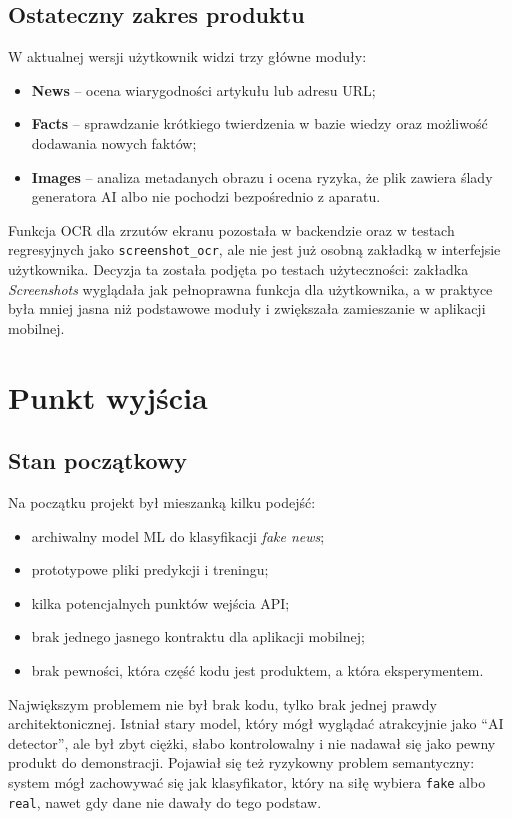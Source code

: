 \documentclass[12pt,a4paper]{article}
\begin{document}
\subsection{Ostateczny zakres produktu}
W aktualnej wersji użytkownik widzi trzy główne moduły:
\begin{itemize}
  \item \textbf{News} -- ocena wiarygodności artykułu lub adresu URL;
  \item \textbf{Facts} -- sprawdzanie krótkiego twierdzenia w bazie wiedzy oraz możliwość dodawania nowych faktów;
  \item \textbf{Images} -- analiza metadanych obrazu i ocena ryzyka, że plik zawiera ślady generatora AI albo nie pochodzi bezpośrednio z aparatu.
\end{itemize}

Funkcja OCR dla zrzutów ekranu pozostała w backendzie oraz w testach regresyjnych jako \texttt{screenshot\_ocr}, ale nie jest już osobną zakładką w interfejsie użytkownika.
Decyzja ta została podjęta po testach użyteczności: zakładka \textit{Screenshots} wyglądała jak pełnoprawna funkcja dla użytkownika, a w praktyce była mniej jasna niż podstawowe moduły i zwiększała zamieszanie w aplikacji mobilnej.

\section{Punkt wyjścia}
\subsection{Stan początkowy}
Na początku projekt był mieszanką kilku podejść:
\begin{itemize}
  \item archiwalny model ML do klasyfikacji \textit{fake news};
  \item prototypowe pliki predykcji i treningu;
  \item kilka potencjalnych punktów wejścia API;
  \item brak jednego jasnego kontraktu dla aplikacji mobilnej;
  \item brak pewności, która część kodu jest produktem, a która eksperymentem.
\end{itemize}

Największym problemem nie był brak kodu, tylko brak jednej prawdy architektonicznej.
Istniał stary model, który mógł wyglądać atrakcyjnie jako ``AI detector'', ale był zbyt ciężki, słabo kontrolowalny i nie nadawał się jako pewny produkt do demonstracji.
Pojawiał się też ryzykowny problem semantyczny: system mógł zachowywać się jak klasyfikator, który na siłę wybiera \texttt{fake} albo \texttt{real}, nawet gdy dane nie dawały do tego podstaw.
\end{document}
